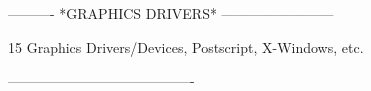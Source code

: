  
 
 
 
 
 
 
 
 
 
 
 
 
 
 
 
 
 
 
 
 
 
 
 
 
 
 
 
 
 
 
 
 
 
 
 
 
 
 
 
 
 
 
 
 
 
 
 
 
 
 
 
 
 
 
 
 
 
 
 
 
 
 
 
 
 
 
 
----------  *GRAPHICS DRIVERS*  ------------------------
 
15
Graphics Drivers/Devices, Postscript, X-Windows, etc.
 
 
----------------------------------------
 
 
 
 
 
 
 
 
 
 
 
 
 
 
 
 
 
 
 
 
 
 
 
 
 
 
 
 
 
 
 
 
 
 
 
 
 
 
 
